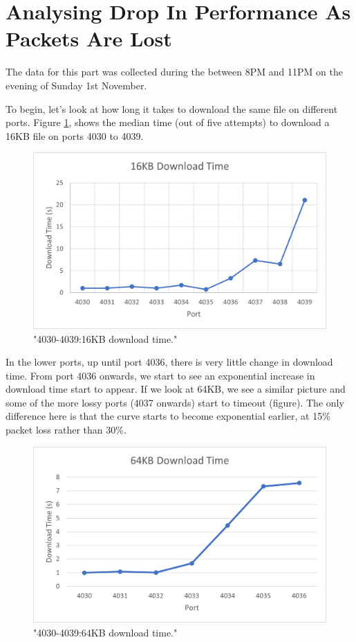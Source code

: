 \documentclass[12pt]{article}
\begin{document}
\section{Analysing Drop In Performance As Packets Are Lost}
The data for this part was collected during the between 8PM and 11PM on the evening of Sunday 1st November.

To begin, let's look at how long it takes to download the same file on different ports.
Figure \ref{figure9: 4030-4039:16KB download time}, shows the median time (out of five attempts) to download a 16KB file on ports 4030 to 4039. 

\begin{figure}[!htbp]
  \centering
  \includegraphics[width=\linewidth]{4030-4039-16KB-download-time.png}
  \caption{"4030-4039:16KB download time."}
  \label{figure9: 4030-4039:16KB download time}
\end{figure}

In the lower ports, up until port 4036, there is very little change in download time.
From port 4036 onwards, we start to see an exponential increase in download time start to appear.
If we look at 64KB, we see a similar picture and some of the more lossy ports (4037 onwards) start to timeout (figure).
The only difference here is that the curve starts to become exponential earlier, at 15\% packet loss rather than 30\%.

\begin{figure}[!htbp]
  \centering
  \includegraphics[width=\linewidth]{4030-4039-64KB-download.png}
  \caption{"4030-4039:64KB download time."}
  \label{figure10: 4030-4039:64KB download time}
\end{figure}
\end{document}
